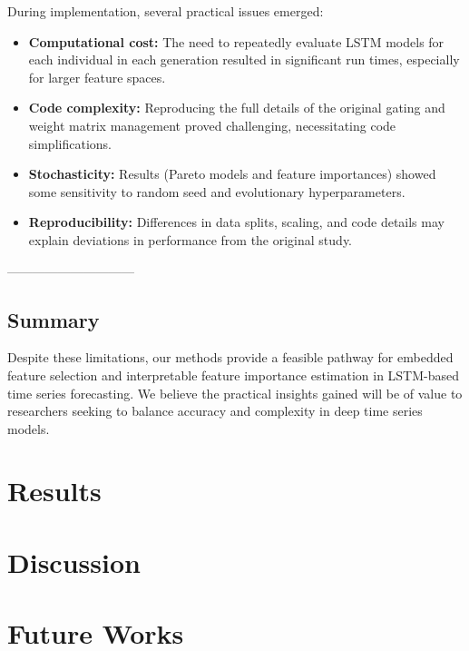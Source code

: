 \documentclass[12pt]{article}
\begin{document}
During implementation, several practical issues emerged:
\begin{itemize}
    \item \textbf{Computational cost:} The need to repeatedly evaluate LSTM models for each individual in each generation resulted in significant run times, especially for larger feature spaces.
    \item \textbf{Code complexity:} Reproducing the full details of the original gating and weight matrix management proved challenging, necessitating code simplifications.
    \item \textbf{Stochasticity:} Results (Pareto models and feature importances) showed some sensitivity to random seed and evolutionary hyperparameters.
    \item \textbf{Reproducibility:} Differences in data splits, scaling, and code details may explain deviations in performance from the original study.
\end{itemize}
------------------------------

\subsection{Summary}

Despite these limitations, our methods provide a feasible pathway for embedded feature selection and interpretable feature importance estimation in LSTM-based time series forecasting. We believe the practical insights gained will be of value to researchers seeking to balance accuracy and complexity in deep time series models.


\section{Results}

\section{Discussion}

\section{Future Works}

\printbibliography
\end{document}
